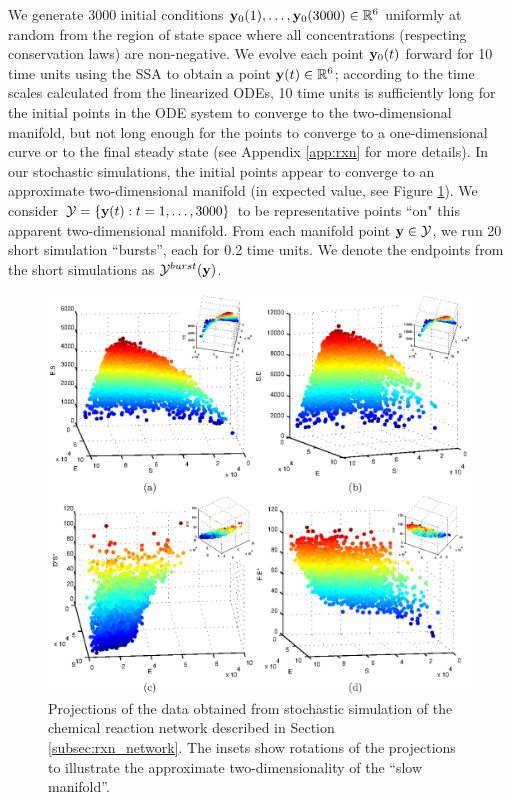 We generate 3000 initial conditions $\mathbf{y}_0(1), \dots, \mathbf{y}_0(3000) \in \mathbb{R}^6$ uniformly at random from the
region of state space where all concentrations (respecting conservation laws) are non-negative.
%
We evolve each point $\mathbf{y}_0(t)$ forward for 10 time units using the SSA to obtain a point $\mathbf{y}(t) \in \mathbb{R}^6$;
according to the time scales calculated from the linearized ODEs, 10 time units is sufficiently long for the initial points in the ODE system to converge to the two-dimensional manifold,
but not long enough for the points to converge to a one-dimensional curve or to the final steady state (see Appendix \ref{app:rxn} for more details).
%
In our stochastic simulations, the initial points appear to converge to an approximate two-dimensional manifold
(in expected value, see Figure \ref{fig:rxn_manifolds}).
%
We consider $\mathcal{Y} = \{ \mathbf{y}(t): t=1, \dots, 3000 \}$ to be representative points ``on" this apparent two-dimensional manifold.
%
From each manifold point $\mathbf{y} \in \mathcal{Y}$, we run 20 short simulation ``bursts'', each for 0.2 time units.
%
We denote the endpoints from the short simulations as $\mathcal{Y}^{burst}(\mathbf{y})$.

\begin{figure}[t]
  \includegraphics[width=6in]{fig3}
    \caption[Projections of the data obtained from stochastic simulation of the chemical reaction network]{Projections of the data obtained from stochastic simulation of the chemical reaction network described in Section \ref{subsec:rxn_network}. The insets show rotations of the projections to illustrate the approximate two-dimensionality of the ``slow manifold''.}
    \label{fig:rxn_manifolds}
\end{figure}

